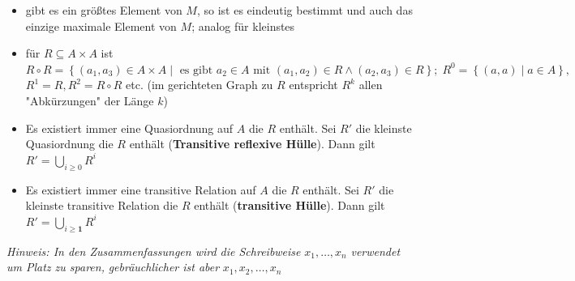 \documentclass[10pt,a4paper]{article}
\begin{document}
\begin{itemize}
\item gibt es ein größtes Element von $M$, so ist es eindeutig bestimmt und auch das einzige maximale Element von $M$; analog für kleinstes 
\item für $R\subseteq A\times A$ ist $R\circ R=\left\lbrace (a_{1},a_{3})\in A\times A\mid \text{ es gibt } a_{2} \in A \text{ mit } (a_{1},a_{2}) \in R\land (a_{2},a_{3})\in R\right\rbrace; \;R^{0}=\left\lbrace (a,a) \mid a\in A\right\rbrace,$\\ $R^{1}=R, R^{2}=R\circ R$ etc. (im gerichteten Graph zu $R$ entspricht $R^{k}$ allen "Abkürzungen" der Länge $k$)
\item Es existiert immer eine Quasiordnung auf $A$ die $R$ enthält. Sei $R'$ die kleinste Quasiordnung die $R$ enthält (\textbf{Transitive reflexive Hülle}). Dann gilt $R'=\bigcup_{i\geq 0} R^{i}$
\item Es existiert immer eine transitive Relation auf $A$ die $R$ enthält. Sei $R'$ die kleinste transitive Relation die $R$ enthält (\textbf{transitive Hülle}). Dann gilt $R'=\bigcup_{i\geq \boldsymbol{1}} R^{i}$
\end{itemize}
\textit{Hinweis: In den Zusammenfassungen wird die Schreibweise} $x_{1},\dotsc ,x_{n}$ \textit{verwendet um Platz zu sparen,} \textit{gebräuchlicher ist aber} $x_{1},x_{2},\dotsc ,x_{n}$
\end{document}
